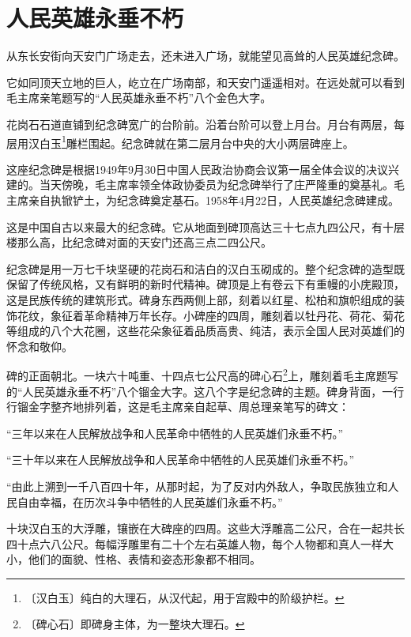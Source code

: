 \documentclass[12pt,UTF-8,openany]{ctexbook}
\begin{document}
\chapter{人民英雄永垂不朽}

\begin{normalsize}
    
    从东长安街向天安门广场走去，还未进入广场，就能望见高耸的人民英雄纪念碑。
    
    它如同顶天立地的巨人，屹立在广场南部，和天安门遥遥相对。在远处就可以看到毛主席亲笔题写的“人民英雄永垂不朽”八个金色大字。
    
    花岗石石道直铺到纪念碑宽广的台阶前。沿着台阶可以登上月台。月台有两层，每层用汉白玉\footnote{〔汉白玉〕纯白的大理石，从汉代起，用于宫殿中的阶级护栏。}雕栏围起。纪念碑就在第二层月台中央的大小两层碑座上。
    
    这座纪念碑是根据1949年9月30日中国人民政治协商会议第一届全体会议的决议兴建的。当天傍晚，毛主席率领全体政协委员为纪念碑举行了庄严隆重的奠基礼。毛主席亲自执锨铲土，为纪念碑奠定基石。1958年4月22日，人民英雄纪念碑建成。
    
    这是中国自古以来最大的纪念碑。它从地面到碑顶高达三十七点九四公尺，有十层楼那么高，比纪念碑对面的天安门还高三点二四公尺。
    
    纪念碑是用一万七千块坚硬的花岗石和洁白的汉白玉砌成的。整个纪念碑的造型既保留了传统风格，又有鲜明的新时代精神。碑顶是上有卷云下有重幔的小庑殿顶，这是民族传统的建筑形式。碑身东西两侧上部，刻着以红星、松柏和旗帜组成的装饰花纹，象征着革命精神万年长存。小碑座的四周，雕刻着以牡丹花、荷花、菊花等组成的八个大花圈，这些花朵象征着品质高贵、纯洁，表示全国人民对英雄们的怀念和敬仰。
    
    碑的正面朝北。一块六十吨重、十四点七公尺高的碑心石\footnote{〔碑心石〕即碑身主体，为一整块大理石。}上，雕刻着毛主席题写的“人民英雄永垂不朽”八个镏金大字。这八个字是纪念碑的主题。碑身背面，一行行镏金字整齐地排列着，这是毛主席亲自起草、周总理亲笔写的碑文：
    
    “三年以来在人民解放战争和人民革命中牺牲的人民英雄们永垂不朽。”
    
    “三十年以来在人民解放战争和人民革命中牺牲的人民英雄们永垂不朽。”
    
    “由此上溯到一千八百四十年，从那时起，为了反对内外敌人，争取民族独立和人民自由幸福，在历次斗争中牺牲的人民英雄们永垂不朽。”
    
    十块汉白玉的大浮雕，镶嵌在大碑座的四周。这些大浮雕高二公尺，合在一起共长四十点六八公尺。每幅浮雕里有二十个左右英雄人物，每个人物都和真人一样大小，他们的面貌、性格、表情和姿态形象都不相同。
    

\end{normalsize}
\end{document}
